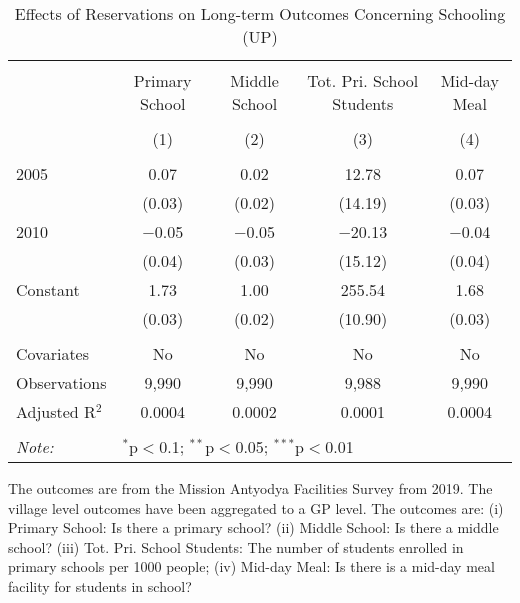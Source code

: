 \begin{table}[!htbp]
\centering
\begin{threeparttable}

  \caption{Effects of Reservations on Long-term Outcomes Concerning Schooling (UP)} 
  \label{up_shrug_schooling_05_10} 
\scriptsize 
\begin{tabular}{@{\extracolsep{0pt}}lcccc} 
\\[-1.8ex]\hline 
\hline \\[-1.8ex] 
 & Primary School & Middle School & Tot. Pri. School Students & Mid-day Meal \\ 
\\[-1.8ex] & (1) & (2) & (3) & (4)\\ 
\hline \\[-1.8ex] 
 2005 & 0.07 & 0.02 & 12.78 & 0.07 \\ 
  & (0.03) & (0.02) & (14.19) & (0.03) \\ 
  2010 & $-$0.05 & $-$0.05 & $-$20.13 & $-$0.04 \\ 
  & (0.04) & (0.03) & (15.12) & (0.04) \\ 
  Constant & 1.73 & 1.00 & 255.54 & 1.68 \\ 
  & (0.03) & (0.02) & (10.90) & (0.03) \\ 
 \hline \\[-1.8ex] 
Covariates & No & No & No & No \\ 
Observations & 9,990 & 9,990 & 9,988 & 9,990 \\ 
Adjusted R$^{2}$ & 0.0004 & 0.0002 & 0.0001 & 0.0004 \\ 
\hline 
\hline \\[-1.8ex] 
\textit{Note:}  & \multicolumn{4}{l}{$^{*}$p$<$0.1; $^{**}$p$<$0.05; $^{***}$p$<$0.01} \\ 
\end{tabular} 
\begin{tablenotes}[flushleft]
\scriptsize
\item The outcomes are from the Mission Antyodya Facilities Survey from 2019. 
                     The village level outcomes have been aggregated to a GP level. 
                     The outcomes are:
                         (i) Primary School: Is there a primary school?
                         (ii) Middle School: Is there a middle school?
                         (iii) Tot. Pri. School Students: The number of students enrolled in primary schools per 1000 people;
                         (iv) Mid-day Meal: Is there is a mid-day meal facility for students in school?
\end{tablenotes}
\end{threeparttable}
\end{table}
